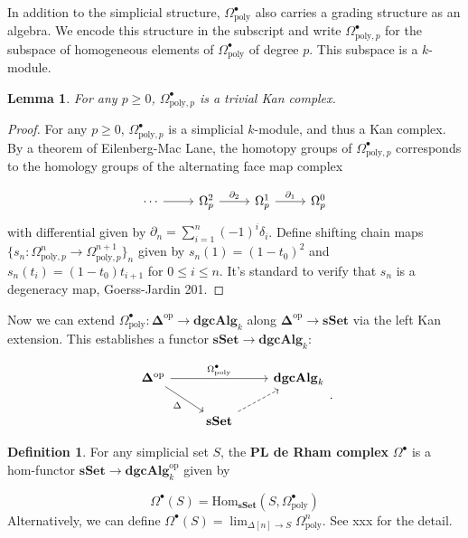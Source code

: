 \documentclass[psamsfonts]{amsart}
\newtheorem{lem}{Lemma}[section]
\theoremstyle{definition}
\newtheorem{defn}{Definition}[section]
\newcommand{\sSet}{\mathbf{sSet}}
\newcommand{\dgcAlg}{\mathbf{dgcAlg}}
\newcommand{\Hom}{\mathrm{Hom}}
\numberwithin{equation}{section}
\begin{document}
In addition to the simplicial structure, $\Omega^\bullet_\textrm{poly}$ also carries a grading structure as an algebra. We encode this structure in the subscript and write $\Omega^\bullet_{\textrm{poly},p}$ for the subspace of homogeneous elements of $\Omega^\bullet_\textrm{poly}$ of degree $p$. This subspace is a $k$-module.

\begin{lem}
For any $p\geq0$, $\Omega^\bullet_{\mathrm{poly},p}$ is a trivial Kan complex.
\end{lem}
\begin{proof}
For any $p\geq0$, $\Omega^\bullet_{\textrm{poly},p}$ is a simplicial $k$-module, and thus a Kan complex. By a theorem of Eilenberg-Mac Lane, the homotopy groups of $\Omega^\bullet_{\textrm{poly},p}$ corresponds to the homology groups of the alternating face map complex

\[\begin{tikzcd}
\cdots\arrow[r]&\Omega^2_p\arrow[r,"\partial_2"]&\Omega^1_p\arrow[r,"\partial_1"]&\Omega^0_p\end{tikzcd}\]
with differential given by $\partial_n=\sum_{i=1}^n(-1)^i\delta_i$. Define shifting chain maps $\{s_n:\Omega^n_{\textrm{poly},p}\to\Omega^{n+1}_{\textrm{poly},p}\}_{n}$ given by $s_n(1)=(1-t_0)^2$ and $s_n(t_i)=(1-t_0)t_{i+1}$ for $0\leq i\leq n$. It's standard to verify that $s_n$ is a degeneracy map, Goerss-Jardin 201. 
\end{proof}

Now we can extend $\Omega^\bullet_\textrm{poly}:\mathbf{\Delta}^\textrm{op}\to\dgcAlg_k$ along $\mathbf{\Delta}^\textrm{op}\to\sSet$ via the left Kan extension. This establishes a functor $\sSet\to\dgcAlg_k$:

\[\begin{tikzcd}
\mathbf{\Delta}^\textrm{op}\arrow[swap]{dr}{\Delta}\arrow{rr}{\Omega^\bullet_\textrm{poly}}&&\dgcAlg_k\\
&\sSet\arrow[swap,near start,dashed]{ur}
\end{tikzcd}.\]

\begin{defn}
For any simplicial set $S$, the \textbf{PL de Rham complex} $\Omega^\bullet$ is a hom-functor $\sSet\to\dgcAlg_k^\mathrm{op}$ given by

\[\Omega^\bullet(S)=\Hom_\sSet(S,\Omega^\bullet_\textrm{poly})\]
Alternatively, we can define $\Omega^\bullet(S)=\lim_{\Delta[n]\to S}\Omega^n_\textrm{poly}$. See xxx for the detail.
\end{defn}
\end{document}
